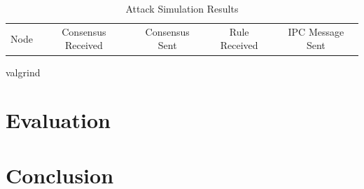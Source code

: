 \documentclass[a4paper, 11pt]{report}
\begin{document}
\begin{table}[H]
\centering
\begin{tabular}{ |c|c|c|c|c| } 
\hline
Node & Consensus Received & Consensus Sent & Rule Received & IPC Message Sent\\

\end{tabular}
\caption{Attack Simulation Results}
\label{tab:attack}
\end{table}

valgrind

\chapter{Evaluation}

\chapter{Conclusion}

\printglossaries

 


\appendix

\end{document}
